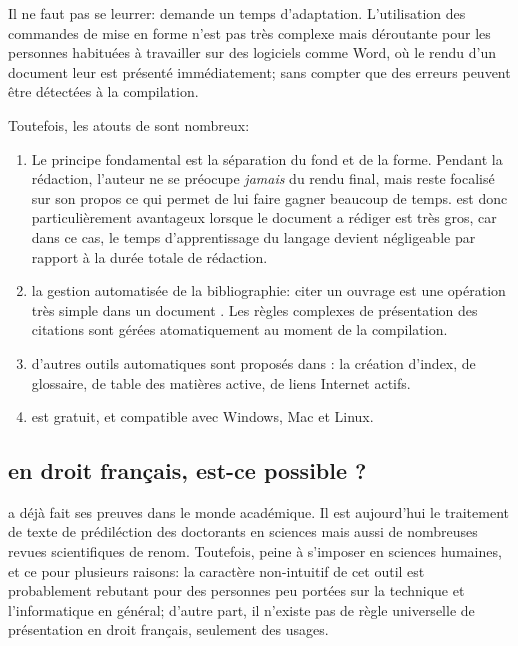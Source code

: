 \documentclass{ltxdockit}
\begin{document}
Il ne faut pas se leurrer: \latex demande un temps d'adaptation. L'utilisation des commandes de mise en forme n'est pas très complexe mais déroutante pour les personnes habituées à travailler sur des logiciels comme Word, où le rendu d'un document leur est présenté immédiatement; sans compter que des erreurs peuvent être détectées à la compilation.

Toutefois, les atouts de \latex sont nombreux:

\begin{enumerate}

\item Le principe fondamental est la séparation du fond et de la forme. Pendant la rédaction, l'auteur ne se préocupe \emph{jamais} du rendu final, mais reste focalisé sur son propos ce qui permet de lui faire gagner beaucoup de temps. \latex est donc particulièrement avantageux lorsque le document a rédiger est très gros, car dans ce cas, le temps d'apprentissage du langage devient négligeable par rapport à la durée totale de rédaction.

\item la gestion automatisée de la bibliographie: citer un ouvrage est une opération très simple dans un document \latex. Les règles complexes de présentation des citations sont gérées atomatiquement au moment de la compilation.

\item d'autres outils automatiques sont proposés dans \latex: la création d'index, de glossaire, de table des matières active, de liens Internet actifs.

\item \latex est gratuit, et compatible avec Windows, Mac et Linux.

\end{enumerate}

\subsection{\latex en droit français, est-ce possible ?}

\latex a déjà fait ses preuves dans le monde académique. Il est aujourd'hui le traitement de texte de prédiléction des doctorants en sciences mais aussi de nombreuses revues scientifiques de renom. Toutefois, \latex peine à s'imposer en sciences humaines, et ce pour plusieurs raisons: la caractère non-intuitif de cet outil est probablement rebutant pour des personnes peu portées sur la technique et l'informatique en général; d'autre part, il n'existe pas de règle universelle de présentation en droit français, seulement des usages.
\end{document}
